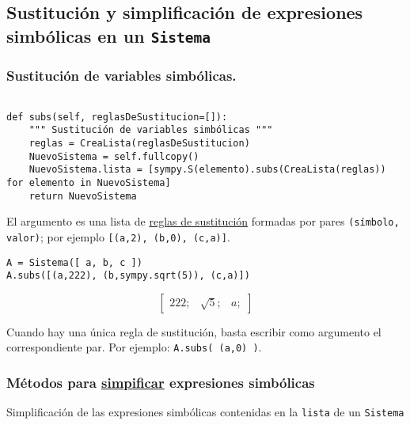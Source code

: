 \documentclass[11pt]{report}
\begin{document}
\subsection{Sustitución y simplificación de expresiones simbólicas en un \texttt{Sistema}}
\label{sec:org197b88c}

\subsubsection{Sustitución de variables simbólicas.}
\label{sec:org812cc9d}

\begin{verbatim}

def subs(self, reglasDeSustitucion=[]):
    """ Sustitución de variables simbólicas """
    reglas = CreaLista(reglasDeSustitucion)
    NuevoSistema = self.fullcopy()
    NuevoSistema.lista = [sympy.S(elemento).subs(CreaLista(reglas)) for elemento in NuevoSistema]
    return NuevoSistema

\end{verbatim}

El argumento es una lista de \href{https://docs.sympy.org/latest/tutorials/intro-tutorial/basic\_operations.html}{reglas de sustitución} formadas por pares
\texttt{(símbolo, valor)}; por ejemplo \texttt{[(a,2), (b,0), (c,a)]}.


\begin{verbatim}
A = Sistema([ a, b, c ])
A.subs([(a,222), (b,sympy.sqrt(5)), (c,a)])
\end{verbatim}

$$\left[ \begin{array}{ccc}222;& \sqrt{5};& a;\end{array} \right]$$

Cuando hay una única regla de sustitución, basta escribir como
argumento el correspondiente par. Por ejemplo: \texttt{A.subs( (a,0) )}.

\subsubsection{Métodos para \href{https://docs.sympy.org/latest/tutorials/intro-tutorial/simplification.html}{simpificar} expresiones simbólicas}
\label{sec:org000d8af}

Simplificación de las expresiones simbólicas contenidas en la \texttt{lista} de un \texttt{Sistema}
\end{document}
